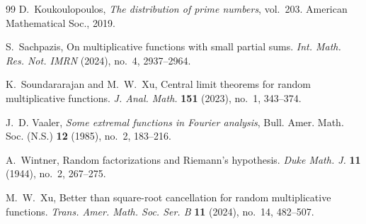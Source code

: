\documentclass[12pt]{amsart}
\numberwithin{equation}{section}
\theoremstyle{plain}
\theoremstyle{definition}
\begin{document}
\begin{thebibliography}{99}
		D.~Koukoulopoulos, \textit{The distribution of prime numbers}, vol.~203. American Mathematical Soc., 2019.
		
		S.~Sachpazis,
		On multiplicative functions with small partial sums.
		\emph{Int. Math. Res. Not. IMRN} (2024), no.~4, 2937--2964.
		
		K.~Soundararajan and M.~W.~Xu,
		Central limit theorems for random multiplicative functions.
		\emph{J. Anal. Math.} \textbf{151} (2023), no.~1, 343--374.
		
		J.~D. Vaaler, \emph{Some extremal functions in Fourier analysis}, Bull. Amer. Math. Soc. (N.S.) \textbf{12} (1985), no.~2, 183--216.
		
		A.~Wintner,
		Random factorizations and Riemann's hypothesis.
		\emph{Duke Math. J.} \textbf{11} (1944), no.~2, 267--275.
		
		M.~W.~Xu,
		Better than square-root cancellation for random multiplicative functions.
		\emph{Trans. Amer. Math. Soc. Ser. B} \textbf{11} (2024), no.~14, 482--507.
		
		
		
		
	\end{thebibliography}
	
	
	
	
	
\end{document}
